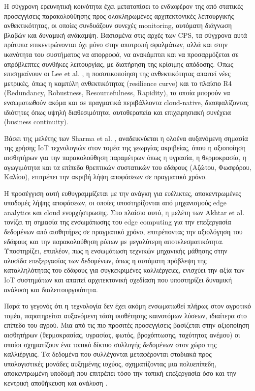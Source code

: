 Η σύγχρονη ερευνητική κοινότητα έχει μετατοπίσει το ενδιαφέρον της από στατικές
προσεγγίσεις παρακολούθησης προς ολοκληρωμένες αρχιτεκτονικές λειτουργικής
ανθεκτικότητας, οι οποίες συνδυάζουν συνεχές monitoring, αυτόματη διάγνωση
βλαβών και δυναμική ανάκαμψη. Βασισμένα στις αρχές των CPS, τα σύγχρονα αυτά
πρότυπα επικεντρώνονται όχι μόνο στην αποτροπή σφαλμάτων, αλλά και στην
ικανότητα του συστήματος να απορροφά, να ανακάμπτει και να προσαρμόζεται σε
απρόβλεπτες συνθήκες λειτουργίας, με διατήρηση της κρίσιμης απόδοσης. Όπως
επισημαίνουν οι Lee et al. \cite{cpsresilience}, η ποσοτικοποίηση της
ανθεκτικότητας απαιτεί νέες μετρικές, όπως η καμπύλη ανθεκτικότητας (resilience
curve) και το πλαίσιο R4 (Redundancy, Robustness, Resourcefulness, Rapidity),
τα οποία μπορούν να ενσωματωθούν ακόμα και σε πραγματικά περιβάλλοντα
cloud-native, διασφαλίζοντας ιδιότητες όπως υψηλή διαθεσιμότητα, αυτοθεραπεία
και επιχειρησιακή συνέχεια (business continuity).

Βάσει της μελέτης των Sharma et al. \cite{iotagriculture}, αναδεικνύεται η
ολοένα αυξανόμενη σημασία της χρήσης IoT τεχνολογιών στον τομέα της γεωργίας
ακριβείας, όπου η αξιοποίηση αισθητήρων για την παρακολούθηση παραμέτρων όπως η
υγρασία, η θερμοκρασία, η αγωγιμότητα και τα επίπεδα θρεπτικών συστατικών του
εδάφους (Αζώτου, Φωσφόρου, Καλίου), επιτρέπει την ακριβή λήψη αποφάσεων σε
πραγματικό χρόνο.

Η προσέγγιση αυτή ευθυγραμμίζεται με την ανάγκη για ευέλικτες, αποκεντρωμένες
υποδομές λήψης αποφάσεων, οι οποίες υποστηρίζονται από μηχανισμούς edge
analytics και cloud ενορχήστρωσης. Στο πλαίσιο αυτό, η μελέτη των Akhtar et al.
\cite{edgeagriculture} τονίζει τη σημασία της ενσωμάτωσης του edge computing
για την επεξεργασία δεδομένων από αισθητήρες σε πραγματικό χρόνο, επιτρέποντας
την αξιολόγηση του εδάφους και την παρακολούθηση ρύπων με μεγαλύτερη
αποτελεσματικότητα. Υποστηρίζει, επιπλέον, πως η ενσωμάτωση τεχνικών μηχανικής
μάθησης στην αλυσίδα επεξεργασίας των δεδομένων, όπως η αυτόματη πρόβλεψη της
καταλληλότητας του εδάφους για συγκεκριμένες καλλιέργειες, ενισχύει την αξία
των IoT συστημάτων και απαιτεί αρχιτεκτονική σχεδίαση που υποστηρίζει δυναμική
ανάλυση και διαλειτουργικότητα.

Παρά το γεγονός ότι η τεχνολογία δεν έχει ακόμη ενσωματωθεί πλήρως στον
αγροτικό τομέα, παρατηρείται αυξανόμενη τάση υιοθέτησης καινοτόμων λύσεων,
ιδιαίτερα στο επίπεδο του αγρού. Μια από τις πιο προσιτές προσεγγίσεις
βασίζεται στην αξιοποίηση αισθητήρων (θερμοκρασίας, υγρασίας, φωτός,
βροχόπτωσης, ταχύτητας ανέμου) οι οποίοι σχηματίζουν ένα τοπικό δίκτυο συλλογής
δεδομένων στον χώρο της καλλιέργιας. Τα δεδομένα που συλλέγονται μεταφέρονται
σταδιακά προς υπολογιστικές μονάδες αυξημένης ισχύος, σχηματίζοντας μια
πολυεπίπεδη, αποκεντρωμένη υποδομή που επιτρέπει τόσο την τοπική επεξεργασία
όσο και την κεντρική αποθήκευση και ανάλυση \cite{iotmonitorcontrol}.

